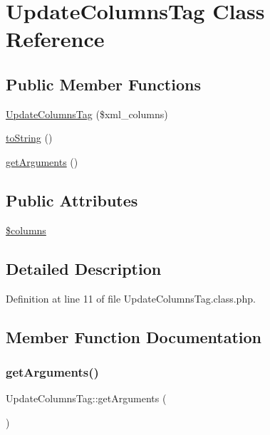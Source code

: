 \hypertarget{classUpdateColumnsTag}{}\section{Update\+Columns\+Tag Class Reference}
\label{classUpdateColumnsTag}
\subsection*{Public Member Functions}
\begin{DoxyCompactItemize}
\item 
\hyperlink{classUpdateColumnsTag_ac046fb7c43564e290d1022aa8299e1aa}{Update\+Columns\+Tag} (\$xml\+\_\+columns)
\item 
\hyperlink{classUpdateColumnsTag_a7653306405140623b429c3751ac11d7f}{to\+String} ()
\item 
\hyperlink{classUpdateColumnsTag_ac964b7ba527d96007a8d3a5749326030}{get\+Arguments} ()
\end{DoxyCompactItemize}
\subsection*{Public Attributes}
\begin{DoxyCompactItemize}
\item 
\hyperlink{classUpdateColumnsTag_aa406bc3dae4ef8fde8679bc97a6141b6}{\$columns}
\end{DoxyCompactItemize}


\subsection{Detailed Description}


Definition at line 11 of file Update\+Columns\+Tag.\+class.\+php.



\subsection{Member Function Documentation}
\hypertarget{classUpdateColumnsTag_ac964b7ba527d96007a8d3a5749326030}{}\label{classUpdateColumnsTag_ac964b7ba527d96007a8d3a5749326030} 
\subsubsection{\texorpdfstring{get\+Arguments()}{getArguments()}}
{\footnotesize\ttfamily Update\+Columns\+Tag\+::get\+Arguments (\begin{DoxyParamCaption}{ }\end{DoxyParamCaption})}

